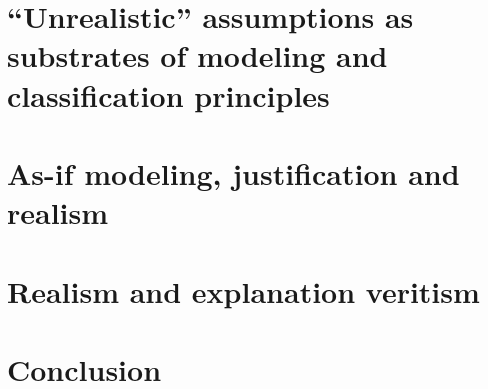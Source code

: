 \documentclass[a4paper,11pt]{article}
\theoremstyle{definition}
\begin{document}
\section{``Unrealistic'' assumptions as substrates of modeling and classification principles}

\section{As-if modeling, justification and realism}

\section{Realism and explanation veritism}

\section{Conclusion}

 

\end{document}
